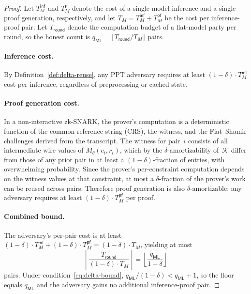 \begin{proof}
Let $T_M^{\mathsf{inf}}$ and $T_M^{\mathsf{pf}}$ denote the cost of a single model inference and a single proof generation, respectively, and let $T_M = T_M^{\mathsf{inf}} + T_M^{\mathsf{pf}}$ be the cost per inference-proof pair. Let $T_{\mathsf{round}}$ denote the computation budget of a flat-model party per round, so the honest count is $q_{\mathsf{ML}} = \lfloor T_{\mathsf{round}} / T_M \rfloor$ pairs.

\paragraph{Inference cost.}
 By Definition~\ref{def:delta-reuse}, any PPT adversary requires at least $(1-\delta) \cdot T_M^{\mathsf{inf}}$ cost per inference, regardless of preprocessing or cached state.

\paragraph{Proof generation cost.}
In a non-interactive zk-SNARK, the prover's computation is a deterministic function of the common reference string (CRS), the witness, and the Fiat--Shamir challenges derived from the transcript. The witness for pair~$i$ consists of all intermediate wire values of $M_\theta(c_i, r_i)$, which by the $\delta$-amortizability of~$\mathcal{K}$ differ from those of any prior pair in at least a $(1-\delta)$-fraction of entries, with overwhelming probability. Since the prover's per-constraint computation depends on the witness values at that constraint, at most a $\delta$-fraction of the prover's work can be reused across pairs. Therefore proof generation is also $\delta$-amortizable: any adversary requires at least $(1-\delta) \cdot T_M^{\mathsf{pf}}$ per proof.

\paragraph{Combined bound.}
The adversary's per-pair cost is at least $(1-\delta) \cdot T_M^{\mathsf{inf}} + (1-\delta) \cdot T_M^{\mathsf{pf}} = (1-\delta) \cdot T_M$, yielding at most
\[
    \left\lfloor \frac{T_{\mathsf{round}}}{(1-\delta) \cdot T_M} \right\rfloor 
    = \left\lfloor \frac{q_{\mathsf{ML}}}{1 - \delta} \right\rfloor
\]
pairs. Under condition~\eqref{eq:delta-bound}, $q_{\mathsf{ML}} / (1-\delta) < q_{\mathsf{ML}} + 1$, so the floor equals $q_{\mathsf{ML}}$ and the adversary gains no additional inference-proof pair.
\end{proof}


